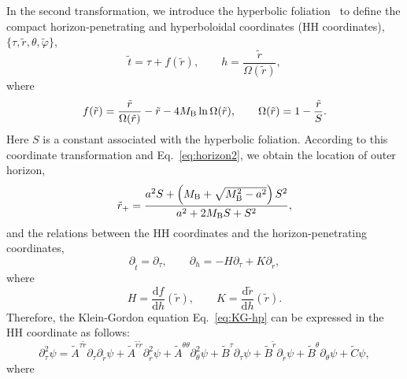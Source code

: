 \documentclass[12pt]{article}
\begin{document}
In the second transformation, we introduce the hyperbolic foliation~\cite{Harms:2014dqa} to define the compact horizon-penetrating and hyperboloidal coordinates (HH coordinates), $\{\tau, \tilde r,\theta, \tilde \varphi\} $,
    \begin{equation}\label{hyper}
    	\tilde t=\tau+f(\tilde r),\qquad h=\frac {\tilde r}{\Omega(\tilde r)},
    \end{equation}
where 
    \begin{equation}
    	f(\tilde r)=\frac {\tilde r} {\Omega({\tilde r})}-{\tilde r}-4M_{\rm B}\, \mathrm{ln}\,\Omega({\tilde r}),\qquad \Omega({\tilde r})=1-\frac {\tilde r}S.
    \end{equation}
Here $S$ is a constant associated with the hyperbolic foliation. 
According to this coordinate transformation and Eq.~\eqref{eq:horizon2}, we obtain the location of outer horizon,
    \begin{equation}
    	{\tilde r}_+=\frac{a^2 S+\left(M_{\rm B}+\sqrt{M_{\rm B}^2-a^2}\right)S^2}{a^2+2M_{\rm B}S+S^2},
    \end{equation}
and the relations between the HH coordinates and the horizon-penetrating coordinates,
    \begin{equation}\label{eq:HH-hp}
    	\partial_{\tilde t}=\partial_\tau,\qquad \partial_h=-H\partial_\tau+K\partial_{\tilde r},
    \end{equation}
where 
\begin{equation}\label{eq:defHandP}
H=\frac{\mathrm df}{\mathrm dh}({\tilde r}), \qquad K=\frac{\mathrm d{\tilde r}}{\mathrm dh}({\tilde r}).
\end{equation} 
Therefore, the Klein-Gordon equation Eq.~\eqref{eq:KG-hp} can be expressed in the HH coordinate as follows:
   \begin{equation}\label{eq:KG-HH}
   	\partial^2_{\tau}\psi
   	={\tilde A}^{\tau {\tilde r}}\partial_{\tau}\partial_{\tilde r}\psi
   	+{\tilde A}^{{\tilde r}{\tilde r}}\partial^2_{\tilde r}\psi
   	+{\tilde A}^{\theta\theta}\partial^2_\theta\psi
   	+{\tilde B}^{\tau}\partial_{\tau}\psi
   	+{\tilde B}^{\tilde r}\partial_{\tilde r}\psi
   	+{\tilde B}^\theta\partial_\theta\psi
   	+{\tilde C}\psi,
   \end{equation}
where
\end{document}
